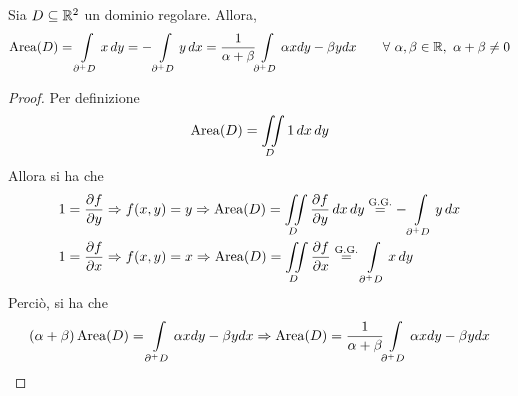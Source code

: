 \begin{corollary}
Sia $D \subseteq \mathbb{R}^2$ un dominio regolare. Allora,
\begin{equation}
    \operatorname{Area}(D)= \int\limits_{\partial^+ D}{x}\, dy = -\int\limits_{\partial^+ D}{y}\, dx = \frac{1}{\alpha+\beta}{\int\limits_{\partial^+ D}{\alpha x dy - \beta y dx}} \qquad \forall\ \alpha, \beta \in \mathbb{R},\ \alpha+\beta \neq 0
\end{equation}
\end{corollary}
\begin{proof}
    Per definizione 
    \begin{equation}
        \operatorname{Area}(D)= \iint\limits_{D}{1}\,dx\, dy
    \end{equation}
    Allora si ha che
    \begin{align}
        &1= \frac{\partial f}{\partial y} \Rightarrow f(x,y)= y \Rightarrow \operatorname{Area}(D)= \iint\limits_{D} \frac{\partial f}{\partial y}\,dx\,dy \overset{\text{G.G.}}{=}  -\int\limits_{\partial^+ D}{y}\,dx\\
      &  1=\frac{\partial f}{\partial x} \Rightarrow f(x,y)= x \Rightarrow \operatorname{Area}(D)= \iint\limits_{D} \frac{\partial f}{\partial x} \overset{\text{G.G.}}{=}  \int\limits_{\partial^+ D}{x}\,dy
    \end{align}
    Perciò, si ha che
    \begin{equation}
        (\alpha+\beta)\operatorname{Area}(D)= \int\limits_{\partial^+ D}{\alpha x dy - \beta y dx} \Rightarrow \operatorname{Area}(D)=  \frac{1}{\alpha+\beta}{\int\limits_{\partial^+ D}{\alpha x dy - \beta y dx}}
    \end{equation}
\end{proof}